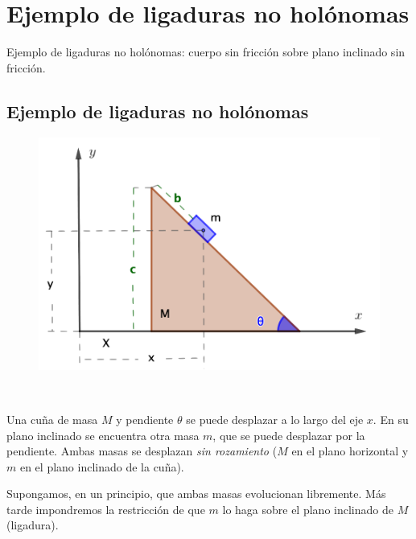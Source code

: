 \chapter{Ejemplo de ligaduras no holónomas}




\vspace{10mm}
\begin{adjustwidth}{50pt}{50pt}
\begin{ejemplo}
Ejemplo de ligaduras no holónomas: cuerpo sin fricción sobre plano inclinado sin fricción.
\end{ejemplo}
\end{adjustwidth}
\vspace{5mm}

\section{Ejemplo de ligaduras no holónomas}

\begin{example}
	
\begin{multicols}{2}
\begin{figure}[H]
	\centering
	\includegraphics[width=.45\textwidth]{imagenes/img10-01.png}
\end{figure}	
$\,$

Una cuña de masa $M$ y pendiente $\theta$ se puede desplazar a lo largo del eje $x$. En su plano inclinado se encuentra otra masa $m$, que se puede desplazar por la pendiente. Ambas masas se desplazan \emph{sin rozamiento} ($M$ en el plano horizontal y $m$ en el plano inclinado de la cuña).
\end{multicols}
\end{example}

\normalsize{Supongamos}, en un principio, que ambas masas evolucionan libremente. Más tarde impondremos la restricción de que $m$ lo haga sobre el plano inclinado de $M$ (ligadura).

